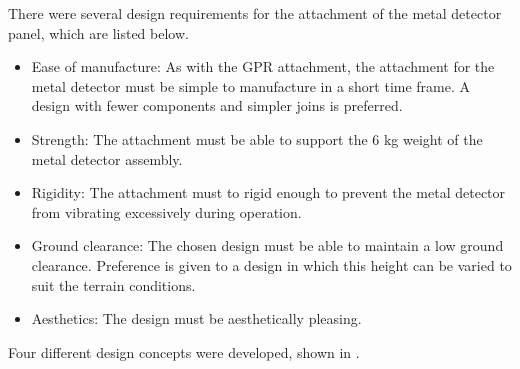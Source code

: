 \documentclass[main.tex]{subfiles}
\begin{document}
There were several design requirements for the attachment of the metal detector panel, which are listed below. 

\begin{itemize}
\item Ease of manufacture: As with the GPR attachment, the attachment for the metal detector must be simple to manufacture in a short time frame. A design with fewer components and simpler joins is preferred.
\item Strength: The attachment must be able to support the 6 kg weight of the metal detector assembly. 
\item Rigidity: The attachment must to rigid enough to prevent the metal detector from vibrating excessively during operation.   
\item Ground clearance: The chosen design must be able to maintain a low ground clearance. Preference is given to a design in which this height can be varied to suit the terrain conditions. 
\item Aesthetics: The design must be aesthetically pleasing. 
\end{itemize}
Four different design concepts were developed, shown in .
\end{document}
